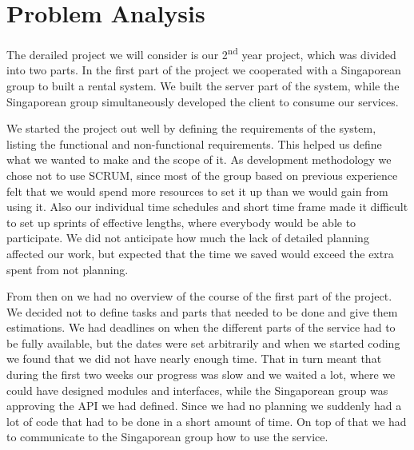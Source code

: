 \section{Problem Analysis}
The derailed project we will consider is our 2\textsuperscript{nd} year project, which was divided into two parts. In the first part of the project we cooperated with a Singaporean group to built a rental system. We built the server part of the system, while the Singaporean group simultaneously developed the client to consume our services.

We started the project out well by defining the requirements of the system, listing the functional and non-functional requirements. This helped us define what we wanted to make and the scope of it.
As development methodology we chose not to use SCRUM, since most of the group based on previous experience felt that we would spend more resources to set it up than we would gain from using it. Also our individual time schedules and short time frame made it difficult to set up sprints of effective lengths, where everybody would be able to participate. We did not anticipate how much the lack of detailed planning affected our work, but expected that the time we saved would exceed the extra spent from not planning.


From then on we had no overview of the course of the first part of the project. We decided not to define tasks and parts that needed to be done and give them estimations.
We had deadlines on when the different parts of the service had to be fully available, but the dates were set arbitrarily and when we started coding we found that we did not have nearly enough time. That in turn meant that during the first two weeks our progress was slow and we waited a lot, where we could have designed modules and interfaces, while the Singaporean group was approving the API we had defined. Since we had no planning we suddenly had a lot of code that had to be done in a short amount of time. On top of that we had to communicate to the Singaporean group how to use the service.
 
